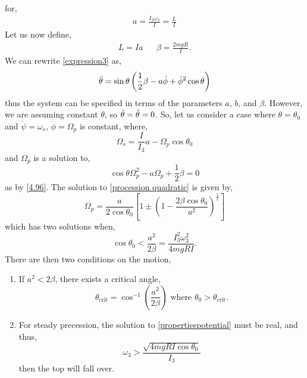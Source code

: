 \documentclass{book}
\begin{document}
for,
\begin{align}
	a = \frac{I_3\omega_3}{I} = \frac{L}{I}
\end{align}
Let us now define,
\begin{align}
	L = Ia && \beta = \frac{2mgR}{I}. 
\end{align}
We can rewrite \eqref{expression3} as,
\begin{equation}
	\Ddot{\theta} = \sin\theta\left(\frac{1}{2}\beta - a \Dot{\phi} + \Dot{\phi}^2\cos\theta\right) \label{4.96}
\end{equation}
thus the system can be specified in terms of the parameters $a$, $b$, and $\beta$. However, we are assuming constant $\theta$, so $\Dot{\theta} = \Ddot{\theta} = 0$. So, let us consider a case where $\theta = \theta_0$ and $\Dot{\psi} = \omega_s$, $\Dot{\phi}=\Omega_p$ is constant, where,
\begin{equation}
	\Omega_s = \frac{I}{I_3}a - \Omega_p\cos\theta_0
\end{equation}
and $\Omega_p$ is a solution to,
\begin{equation}
	\cos\theta \Omega_p^2 - a\Omega_p + \frac{1}{2}\beta = 0 \label{procession quadratic}
\end{equation}
as by \eqref{4.96}. The solution to \eqref{procession quadratic} is given by,
\begin{equation}
	\Omega_p = \frac{a}{2\cos\theta_0}\left[1\pm\left(1 - \frac{2\beta\cos\theta_0}{a^2}\right)^{\frac{1}{2}}\right]
\end{equation}
which has two solutions when,
\begin{equation}
	\cos\theta_0 < \frac{a^2}{2\beta} = \frac{I_3^2\omega_3^2}{4mgRI}.
\end{equation}
There are then two conditions on the motion,
\begin{enumerate}
	\item  If $a^2 < 2\beta$, there exists a critical angle,
	\begin{equation}
		\theta_{\text{crit}} = \cos^{-1}\left(\frac{a^2}{2\beta}\right)\text{ where } \theta_0 > \theta_{\text{crit}}.
	\end{equation}
	\item For steady precession, the solution to \eqref{propertiespotential} must be real, and thus,
	\begin{equation}
		\omega_3 > \frac{\sqrt{4mgRI\cos\theta_0}}{I_3}\label{condition}
	\end{equation}
	then the top will fall over.
\end{enumerate}
\end{document}
